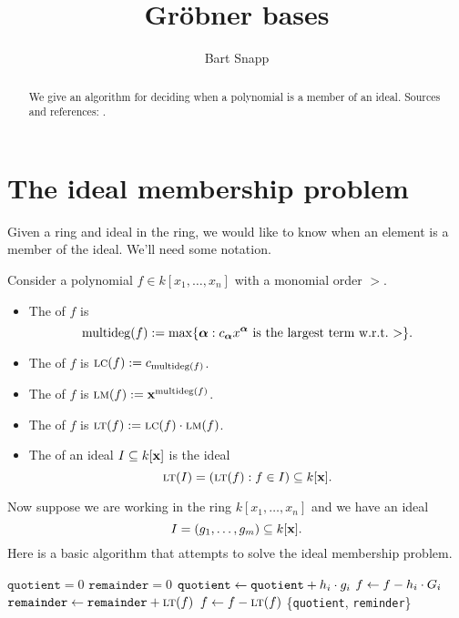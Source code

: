 \documentclass{ximera}
\title{Gr\"obner bases}
\author{Bart Snapp}
\begin{document}
\begin{abstract}
  We give an algorithm for deciding when a polynomial is a member of
  an ideal.  Sources and references: \cite{CLO2007,hS2003}.
\end{abstract}
\maketitle



\section{The ideal membership problem}

Given a ring and ideal in the ring, we would like to know when an
element is a member of the ideal. We'll need some notation.


\begin{definition}
  Consider a polynomial $f\in k[x_1,\dots, x_n]$ with a monomial order
  $>$.
  \begin{itemize}
    \item The  of $f$ is
    \[
    \operatorname{multideg}(f) := \max\{{\boldsymbol\alpha}: \text{$c_{\boldsymbol\alpha} x^{\boldsymbol\alpha}$ is the largest term w.r.t.\ $>$} \}.
    \]
  \item The  of $f$ is $\textsc{lc}(f) := c_{\operatorname{multideg}(f)}$.
  \item The  of $f$ is $\textsc{lm}(f) := \mathbf{x}^{\operatorname{multideg}(f)}$.
  \item The  of $f$ is $\textsc{lt}(f) := \textsc{lc}(f)\cdot \textsc{lm}(f)$.
  \item The  of an ideal $I\subseteq k[\mathbf{x}]$ is
    the ideal
    \[
    \textsc{lt}(I) = (\textsc{lt}(f): f\in I)\subseteq k[\mathbf{x}].
    \]
  \end{itemize}
\end{definition}

Now suppose we are working in the ring $k[x_1,\dots, x_n]$ and we have an ideal
\[
I = (g_1,\dots, g_m) \subseteq k[\mathbf{x}].
\]
Here is a basic algorithm that attempts to solve the ideal membership
problem.

\begin{algorithm}
  \hfill
  \begin{algorithmic}[1]
    \State $\texttt{quotient} = 0$
    \State $\texttt{remainder} = 0$
    \Repeat
    \State $\texttt{quotient} \leftarrow \texttt{quotient} + h_i\cdot g_i$
    \State $f \leftarrow f - h_i\cdot G_i$
    \Else
    \State $\texttt{remainder} \leftarrow \texttt{remainder} + \textsc{lt}(f)$
    \State $f\leftarrow f- \textsc{lt}(f)$
    \EndIf
    \Return\{\texttt{quotient}, \texttt{reminder}\}
    \EndProcedure
  \end{algorithmic}
\end{algorithm}
\end{document}
